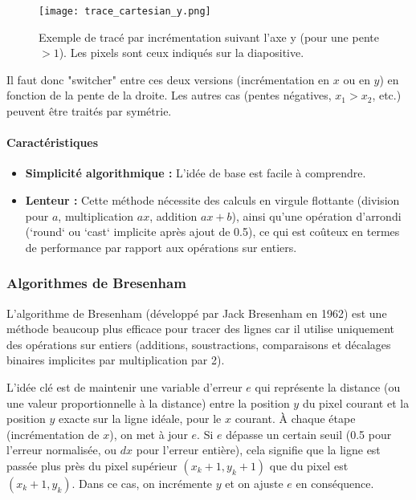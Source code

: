 \documentclass{article}
\begin{document}
\begin{figure}[H]
\centering
\texttt{[image: trace\_cartesian\_y.png]}
\caption{Exemple de tracé par incrémentation suivant l'axe y (pour une pente $> 1$). Les pixels sont ceux indiqués sur la diapositive.}
\label{fig:trace_cartesian_y}
\end{figure}

Il faut donc "switcher" entre ces deux versions (incrémentation en $x$ ou en $y$) en fonction de la pente de la droite. Les autres cas (pentes négatives, $x_1 > x_2$, etc.) peuvent être traités par symétrie.

\paragraph{Caractéristiques}
\begin{itemize}
    \item \textbf{Simplicité algorithmique :} L'idée de base est facile à comprendre.
    \item \textbf{Lenteur :} Cette méthode nécessite des calculs en virgule flottante (division pour $a$, multiplication $ax$, addition $ax+b$), ainsi qu'une opération d'arrondi (`round` ou `cast` implicite après ajout de 0.5), ce qui est coûteux en termes de performance par rapport aux opérations sur entiers.
\end{itemize}

\subsubsection{Algorithmes de Bresenham}
L'algorithme de Bresenham (développé par Jack Bresenham en 1962) est une méthode beaucoup plus efficace pour tracer des lignes car il utilise uniquement des opérations sur entiers (additions, soustractions, comparaisons et décalages binaires implicites par multiplication par 2).

L'idée clé est de maintenir une variable d'erreur $e$ qui représente la distance (ou une valeur proportionnelle à la distance) entre la position $y$ du pixel courant et la position $y$ exacte sur la ligne idéale, pour le $x$ courant. À chaque étape (incrémentation de $x$), on met à jour $e$. Si $e$ dépasse un certain seuil (0.5 pour l'erreur normalisée, ou $dx$ pour l'erreur entière), cela signifie que la ligne est passée plus près du pixel supérieur $(x_k+1, y_k+1)$ que du pixel est $(x_k+1, y_k)$. Dans ce cas, on incrémente $y$ et on ajuste $e$ en conséquence.
\end{document}
